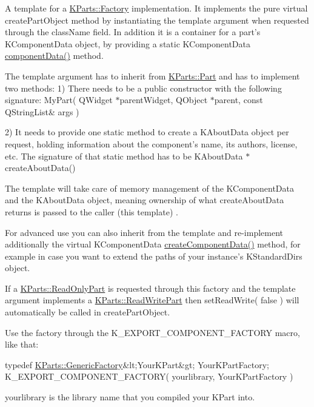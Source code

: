 A template for a \hyperlink{classKParts_1_1Factory}{K\+Parts\+::\+Factory} implementation. It implements the pure virtual create\+Part\+Object method by instantiating the template argument when requested through the class\+Name field. In addition it is a container for a part's K\+Component\+Data object, by providing a static K\+Component\+Data \hyperlink{classKParts_1_1GenericFactoryBase_ad4a0ca70dec2fe8f4e0d4293e17eb776}{component\+Data()} method.

The template argument has to inherit from \hyperlink{classKParts_1_1Part}{K\+Parts\+::\+Part} and has to implement two methods\+: 1) There needs to be a public constructor with the following signature\+: My\+Part( Q\+Widget $\ast$parent\+Widget, Q\+Object $\ast$parent, const Q\+String\+List\& args )

2) It needs to provide one static method to create a K\+About\+Data object per request, holding information about the component's name, its authors, license, etc. The signature of that static method has to be K\+About\+Data $\ast$create\+About\+Data()

The template will take care of memory management of the K\+Component\+Data and the K\+About\+Data object, meaning ownership of what create\+About\+Data returns is passed to the caller (this template) .

For advanced use you can also inherit from the template and re-\/implement additionally the virtual K\+Component\+Data \hyperlink{classKParts_1_1GenericFactoryBase_ae90ec2009529241553290269f3108134}{create\+Component\+Data()} method, for example in case you want to extend the paths of your instance's K\+Standard\+Dirs object.

If a \hyperlink{classKParts_1_1ReadOnlyPart}{K\+Parts\+::\+Read\+Only\+Part} is requested through this factory and the template argument implements a \hyperlink{classKParts_1_1ReadWritePart}{K\+Parts\+::\+Read\+Write\+Part} then set\+Read\+Write( false ) will automatically be called in create\+Part\+Object.

Use the factory through the K\+\_\+\+E\+X\+P\+O\+R\+T\+\_\+\+C\+O\+M\+P\+O\+N\+E\+N\+T\+\_\+\+F\+A\+C\+T\+O\+R\+Y macro, like that\+: 
\begin{DoxyCode}
\textcolor{keyword}{typedef} \hyperlink{classKParts_1_1GenericFactory}{KParts::GenericFactory}&lt;YourKPart&gt; YourKPartFactory;
K\_EXPORT\_COMPONENT\_FACTORY( yourlibrary, YourKPartFactory )
\end{DoxyCode}
 yourlibrary is the library name that you compiled your K\+Part into. 

